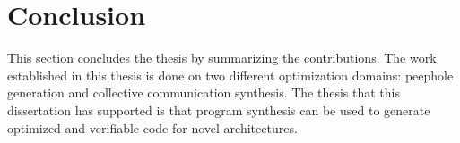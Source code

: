 \chapter{Conclusion}
\label{chap:conclusion}

This section concludes the thesis by summarizing the contributions.
%
The work established in this thesis is done on two different optimization
domains: peephole generation and collective communication synthesis.
%
The thesis that this dissertation has supported is that program synthesis can
be used to generate optimized and verifiable code for novel architectures.












